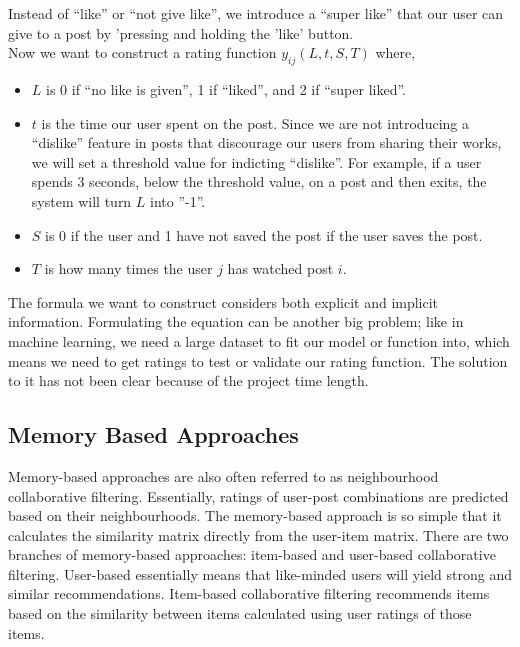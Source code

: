 Instead of “like” or “not give like”, we introduce a “super like” that our user can give to a post by 'pressing and holding the 'like' button.
\\Now we want to construct a rating function $y_{ij}(L,t,S,T)$ where, 
\begin{itemize}
\item$L$ is 0 if “no like is given”, 1 if “liked”, and 2 if “super liked”.
\item$t$ is the time our user spent on the post. Since we are not introducing a “dislike” feature in posts that discourage our users from sharing their works, we will set a threshold value for indicting “dislike”. For example, if a user spends 3 seconds, below the threshold value, on a post and then exits, the system will turn $L$ into ”-1”.
\item$S$ is 0 if the user and 1 have not saved the post if the user saves the post.
\item$T$ is how many times the user $j$ has watched post $i$.
\end{itemize}
The formula we want to construct considers both explicit and implicit information. Formulating the equation can be another big problem; like in machine learning, we need a large dataset to fit our model or function into, which means we need to get ratings to test or validate our rating function. The solution to it has not been clear because of the project time length.

\subsection{Memory Based Approaches}
Memory-based approaches are also often referred to as neighbourhood collaborative filtering. Essentially, ratings of user-post combinations are predicted based on their neighbourhoods. The memory-based approach is so simple that it calculates the similarity matrix directly from the user-item matrix. There are two branches of memory-based approaches: item-based and user-based collaborative filtering. User-based essentially means that like-minded users will yield strong and similar recommendations. Item-based collaborative filtering recommends items based on the similarity between items calculated using user ratings of those items.
